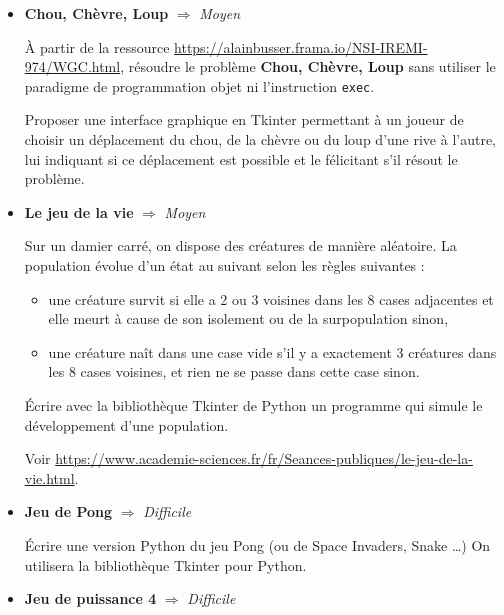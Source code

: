 \documentclass[a4paper, french, 12pt]{article}  %
\newcounter{act}
\begin{document}
\begin{itemize}

\item \textbf{Chou, Chèvre, Loup} $\Rightarrow$ \textit{Moyen}


\medskip


À partir de la ressource \url{https://alainbusser.frama.io/NSI-IREMI-974/WGC.html}, résoudre le problème \textbf{Chou, Chèvre, Loup}  sans utiliser le paradigme de programmation objet ni l'instruction \texttt{exec}.

Proposer une interface graphique en Tkinter permettant à un joueur de choisir un déplacement du  chou, de la chèvre ou du  loup d'une rive à l'autre, lui indiquant si ce déplacement est possible et le félicitant s'il résout le problème.


\bigskip

\item \textbf{Le jeu de la vie} $\Rightarrow$ \textit{Moyen}

\medskip

Sur un damier carré, on dispose des créatures de manière aléatoire. La population évolue d'un état au suivant selon les règles suivantes :
\begin{itemize}
\item une créature survit si elle a 2 ou 3 voisines dans les 8 cases adjacentes et elle meurt à cause de son isolement ou de la surpopulation sinon,
\item une créature naît dans une case vide s'il y a exactement 3 créatures dans les 8 cases voisines, et rien ne se passe dans cette case sinon.
\end{itemize}
Écrire avec la bibliothèque Tkinter de Python un  programme qui simule le développement d'une population.

Voir \url{https://www.academie-sciences.fr/fr/Seances-publiques/le-jeu-de-la-vie.html}.

\bigskip

\item \textbf{Jeu de Pong}   $\Rightarrow$ \textit{Difficile}

\medskip

Écrire une version Python du jeu Pong (ou de Space Invaders, Snake \ldots) On utilisera la bibliothèque Tkinter pour Python.

\bigskip



\item \textbf{Jeu de puissance 4} $\Rightarrow$ \textit{Difficile}


\end{itemize}
\end{document}
